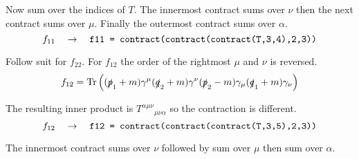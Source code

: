 \documentclass[12pt]{article}
\begin{document}
Now sum over the indices of $T$.
The innermost contract sums over $\nu$ then the next contract sums over $\mu$.
Finally the outermost contract sums over $\alpha$.
\begin{equation*}
f_{11}\quad\rightarrow\quad
\text{\tt f11 = contract(contract(contract(T,3,4),2,3))}
\end{equation*}

Follow suit for $f_{22}$.
For $f_{12}$ the order of the rightmost $\mu$ and $\nu$ is reversed.
\begin{equation*}
f_{12}=\mathop{\rm Tr}
\left(
(\slashed{p}_1+m)\gamma^\mu(\slashed{q}_2+m)\gamma^\nu(\slashed{p}_2-m)\gamma_\mu(\slashed{q}_1+m)\gamma_\nu
\right)
\end{equation*}

The resulting inner product is $T^{\alpha\mu\nu}{}_{\mu\nu\alpha}$
so the contraction is different.
\begin{equation*}
f_{12}
\quad\rightarrow\quad
\text{\tt f12 = contract(contract(contract(T,3,5),2,3))}
\end{equation*}

The innermost contract sums over $\nu$ followed by sum over $\mu$ then sum over $\alpha$.
\end{document}
